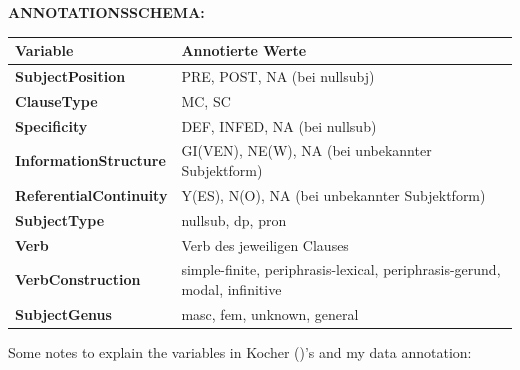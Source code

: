 \documentclass[
  letterpaper,
  DIV=11,
  numbers=noendperiod]{scrartcl}
\newcounter{none} %
\begin{document}
\textbf{ANNOTATIONSSCHEMA:}

{\def\LTcaptype{none} %
\begin{longtable}[]{@{}
  >{\raggedright\arraybackslash}p{}
  >{\raggedright\arraybackslash}p{}@{}}
\toprule\noalign{}
\begin{minipage}[b]{\linewidth}\raggedright
Variable
\end{minipage} & \begin{minipage}[b]{\linewidth}\raggedright
Annotierte Werte
\end{minipage} \\
\midrule\noalign{}
\endhead
\bottomrule\noalign{}
\endlastfoot
\textbf{SubjectPosition} & PRE, POST, NA (bei nullsubj) \\
\textbf{ClauseType} & MC, SC \\
\textbf{Specificity} & DEF, INFED, NA (bei nullsub) \\
\textbf{InformationStructure} & GI(VEN), NE(W), NA (bei unbekannter
Subjektform) \\
\textbf{ReferentialContinuity} & Y(ES), N(O), NA (bei unbekannter
Subjektform) \\
\textbf{SubjectType} & nullsub, dp, pron \\
\textbf{Verb} & Verb des jeweiligen Clauses \\
\textbf{VerbConstruction} & simple-finite, periphrasis-lexical,
periphrasis-gerund, modal, infinitive \\
\textbf{SubjectGenus} & masc, fem, unknown, general \\
\end{longtable}
}

Some notes to explain the variables in Kocher
()'s and my data annotation:
\end{document}
